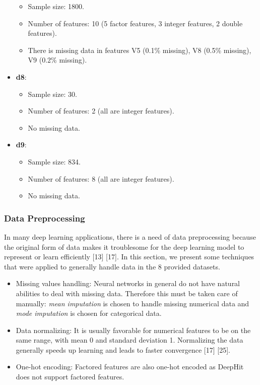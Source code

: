 \documentclass[
]{article}
\providecommand{\tightlist}{%
  \setlength{\itemsep}{0pt}\setlength{\parskip}{0pt}}
\begin{document}
\begin{itemize}
  \begin{itemize}
  \tightlist
  \item
    Sample size: 1800.
  \item
    Number of features: 10 (5 factor features, 3 integer features, 2 double features).
  \item
    There is missing data in features V5 (0.1\% missing), V8 (0.5\% missing), V9 (0.2\% missing).
  \end{itemize}
\item
  \textbf{d8}:

  \begin{itemize}
  \tightlist
  \item
    Sample size: 30.
  \item
    Number of features: 2 (all are integer features).
  \item
    No missing data.
  \end{itemize}
\item
  \textbf{d9}:

  \begin{itemize}
  \tightlist
  \item
    Sample size: 834.
  \item
    Number of features: 8 (all are integer features).
  \item
    No missing data.
  \end{itemize}
\end{itemize}

\hypertarget{data-preprocessing}{%
\subsubsection{Data Preprocessing}\label{data-preprocessing}}

In many deep learning applications, there is a need of data preprocessing because the original form of data makes it troublesome for the deep learning model to represent or learn efficiently {[}13{]} {[}17{]}. In this section, we present some techniques that were applied to generally handle data in the 8 provided datasets.
\vspace{-0.5cm}

\begin{itemize}
\tightlist
\item
  Missing values handling: Neural networks in general do not have natural abilities to deal with missing data. Therefore this must be taken care of manually: \emph{mean imputation} is chosen to handle missing numerical data and \emph{mode imputation} is chosen for categorical data.
\item
  Data normalizing: It is usually favorable for numerical features to be on the same range, with mean 0 and standard deviation 1. Normalizing the data generally speeds up learning and leads to faster convergence {[}17{]} {[}25{]}.
\item
  One-hot encoding: Factored features are also one-hot encoded as DeepHit does not support factored features.
\end{itemize}
\end{document}
